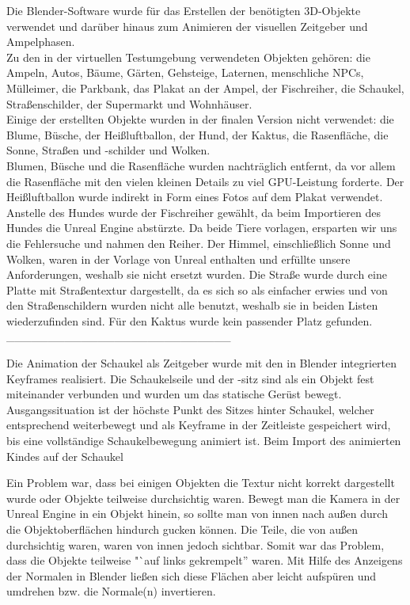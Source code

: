\documentclass{Bericht}
\begin{document}
Die Blender-Software wurde für das Erstellen der benötigten 3D-Objekte verwendet und darüber hinaus zum Animieren der visuellen Zeitgeber und Ampelphasen.\\
Zu den in der virtuellen Testumgebung verwendeten Objekten gehören: die Ampeln, Autos, Bäume, Gärten, Gehsteige, Laternen, menschliche NPCs, Mülleimer, die Parkbank, das Plakat an der Ampel, der Fischreiher, die Schaukel, Straßenschilder, der Supermarkt und Wohnhäuser.\\
Einige der erstellten Objekte wurden in der finalen Version nicht verwendet: die Blume, Büsche, der Heißluftballon, der Hund, der Kaktus, die Rasenfläche, die Sonne, Straßen und -schilder und Wolken.\\
		Blumen, Büsche und die Rasenfläche wurden nachträglich entfernt, da vor allem die Rasenfläche mit den vielen kleinen Details zu viel GPU-Leistung forderte. Der Heißluftballon wurde indirekt in Form eines Fotos auf dem Plakat verwendet. 
 		Anstelle des Hundes wurde der Fischreiher gewählt, da beim Importieren des Hundes die Unreal Engine abstürzte. Da beide Tiere vorlagen, ersparten wir uns die Fehlersuche und nahmen den Reiher. 
		Der Himmel, einschließlich Sonne und Wolken, waren in der Vorlage von Unreal enthalten und erfüllte unsere Anforderungen, weshalb sie nicht ersetzt wurden. 
		Die Straße wurde durch eine Platte mit Straßentextur dargestellt, da es sich so als einfacher erwies und von den Straßenschildern wurden nicht alle benutzt, weshalb sie in beiden Listen wiederzufinden sind. 
		Für den Kaktus wurde kein passender Platz gefunden. \\
		___________________________
		
		Die Animation der Schaukel als Zeitgeber wurde mit den in Blender integrierten Keyframes realisiert. Die Schaukelseile und der -sitz sind als ein Objekt fest miteinander verbunden und wurden um das statische Gerüst bewegt. Ausgangssituation ist der höchste Punkt des Sitzes hinter Schaukel, welcher entsprechend weiterbewegt und als Keyframe in der Zeitleiste gespeichert wird, bis eine vollständige Schaukelbewegung animiert ist.  
		Beim Import des animierten Kindes auf der Schaukel 
		




			Ein Problem war, dass bei einigen Objekten die Textur nicht korrekt dargestellt wurde oder Objekte teilweise durchsichtig waren. Bewegt man die Kamera in der Unreal Engine in ein Objekt hinein, so sollte man von innen nach außen durch die Objektoberflächen hindurch gucken können. Die Teile, die von außen durchsichtig waren, waren von innen jedoch sichtbar. Somit war das Problem, dass die Objekte teilweise "`auf links gekrempelt'' waren. Mit Hilfe des Anzeigens der Normalen in Blender ließen sich diese Flächen aber leicht aufspüren und umdrehen bzw. die Normale(n) invertieren.
			
\end{document}
